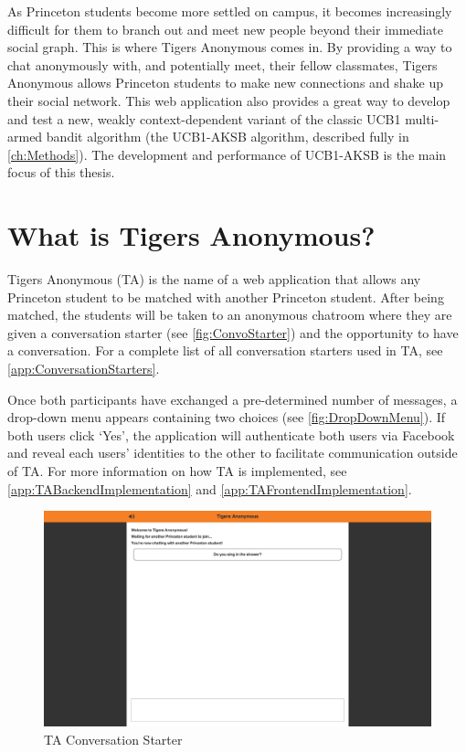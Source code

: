 As Princeton students become more settled on campus, it becomes increasingly difficult for them to branch out and meet new people beyond their immediate social graph. This is where Tigers Anonymous comes in. By providing a way to chat anonymously with, and potentially meet, their fellow classmates, Tigers Anonymous allows Princeton students to make new connections and shake up their social network. This web application also provides a great way to develop and test a new, weakly context-dependent variant of the classic UCB1 multi-armed bandit algorithm (the UCB1-AKSB algorithm, described fully in \autoref{ch:Methods}). The development and performance of UCB1-AKSB is the main focus of this thesis.

\section{What is Tigers Anonymous?}

Tigers Anonymous (TA) is the name of a web application that allows any Princeton student to be matched with another Princeton student. After being matched, the students will be taken to an anonymous chatroom where they are given a conversation starter (see \autoref{fig:ConvoStarter}) and the opportunity to have a conversation. For a complete list of all conversation starters used in TA, see \autoref{app:ConversationStarters}.

Once both participants have exchanged a pre-determined number of messages, a drop-down menu appears containing two choices (see \autoref{fig:DropDownMenu}). If both users click `Yes', the application will authenticate both users via Facebook and reveal each users' identities to the other to facilitate communication outside of TA. For more information on how TA is implemented, see \autoref{app:TABackendImplementation} and \autoref{app:TAFrontendImplementation}.

\begin{figure}[h]
\centering
\includegraphics[trim= 120mm 250mm 120mm 0mm, clip, scale=0.36]{./Figures/ConversationStarter}
\caption{TA Conversation Starter}
\label{fig:ConvoStarter}
\end{figure}

